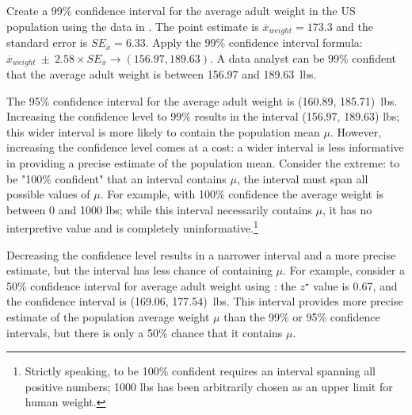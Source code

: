 \begin{example} {
    Create a 99\% confidence interval for the average adult weight in the US population using the data in . The point estimate is $\overline{x}_{weight} = 173.3$ and the standard error is $SE_{\overline{x}} = 6.33$.}
Apply the 99\% confidence interval formula: $\overline{x}_{weight}\ \pm\ 2.58 \times  SE_{\overline{x}} \rightarrow (156.97, 189.63)$. A data analyst can be 99\% confident that the average adult weight is between 156.97 and 189.63~lbs.
\end{example}

The 95\% confidence interval for the average adult weight is (160.89, 185.71)~lbs. Increasing the confidence level to 99\% results in the interval (156.97, 189.63) lbs; this wider interval is more likely to contain the population mean $\mu$. However, increasing the confidence level comes at a cost: a wider interval is less informative in providing a precise estimate of the population mean. Consider the extreme: to be "100\% confident" that an interval contains $\mu$, the interval must span all possible values of $\mu$. For example, with 100\% confidence the average weight is between 0 and 1000 lbs; while this interval necessarily contains $\mu$, it has no interpretive value and is completely uninformative.\footnote{Strictly speaking, to be 100\% confident requires an interval spanning all positive numbers; 1000 lbs has been arbitrarily chosen as an upper limit for human weight.} 

Decreasing the confidence level results in a narrower interval and a more precise estimate, but the interval has less chance of containing $\mu$. For example, consider a 50\% confidence interval for average adult weight using : the $z^{\star}$ value is 0.67, and the confidence interval is (169.06, 177.54)~lbs. This interval provides more precise estimate of the population average weight $\mu$ than the 99\% or 95\% confidence intervals, but there is only a 50\% chance that it contains $\mu$.

